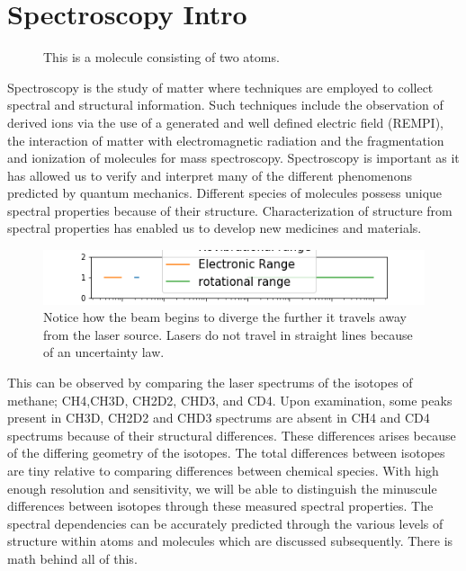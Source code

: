 \documentclass[11pt,a4paper]{book}
\newcommand{\imginput}[1]{} %
\begin{document}
	\section{Spectroscopy Intro}
		\label{sec:Spectroscopy Intro}
		\begin{figure} [!ht]
			\centering
			\def\svgwidth{\columnwidth}
			\huge
			\resizebox{8cm}{!}{\imginput{images/molecule.pdf_tex}}
			\caption{This is a molecule consisting of two atoms.}
			\label{fig:molecule-alpha}
		\end{figure}
		
		Spectroscopy is the study of matter where techniques are employed to collect spectral and structural information. Such techniques include the observation of derived ions via the use of a generated and well defined electric field (REMPI), the interaction of matter with electromagnetic radiation and the fragmentation and ionization of molecules for mass spectroscopy. Spectroscopy is important as it has allowed us to verify and interpret many of the different phenomenons predicted by quantum mechanics. Different species of molecules possess unique spectral properties because of their structure. Characterization of structure from spectral properties has enabled us to develop new medicines and materials. 

		\begin{figure} [!ht]
			\centering
			\def\svgwidth{\columnwidth}
			\Huge
			\includegraphics[scale=0.5]{images/chapter-1/ranges_of_transitions}
			\caption{Notice how the beam begins to diverge the further it travels away from the laser source. Lasers do not travel in straight lines because of an uncertainty law.}
			\label{fig:lase}
		\end{figure}

		This can be observed by comparing the laser spectrums of the isotopes of methane; CH4,CH3D, CH2D2, CHD3, and CD4. Upon examination, some peaks present in CH3D, CH2D2 and CHD3 spectrums are absent in CH4 and CD4 spectrums because of their structural differences. These differences arises because of the differing geometry of the isotopes. The total differences between isotopes are tiny relative to comparing differences between chemical species. With high enough resolution and sensitivity, we will be able to distinguish the minuscule differences between isotopes through these measured spectral properties. The spectral dependencies can be accurately predicted through the various levels of structure within atoms and molecules which are discussed subsequently. There is math behind all of this.
		
\end{document}
